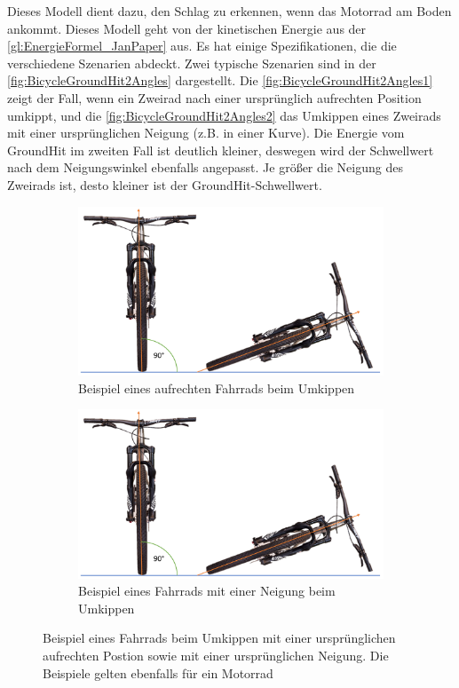 Dieses Modell dient dazu, den Schlag zu erkennen, wenn das Motorrad am Boden ankommt. Dieses Modell geht von der kinetischen Energie aus der \autoref{gl:EnergieFormel_JanPaper} aus. Es hat einige Spezifikationen, die die verschiedene Szenarien abdeckt. Zwei typische Szenarien sind in der \autoref{fig:BicycleGroundHit2Angles} dargestellt. Die \autoref{fig:BicycleGroundHit2Angles1} zeigt der Fall, wenn ein Zweirad nach einer ursprünglich aufrechten Position umkippt, und die \autoref{fig:BicycleGroundHit2Angles2} das Umkippen eines Zweirads mit einer ursprünglichen Neigung (z.B. in einer Kurve).
Die Energie vom GroundHit im zweiten Fall ist deutlich kleiner, deswegen wird der Schwellwert nach dem Neigungswinkel ebenfalls angepasst. Je größer die Neigung des Zweirads ist, desto kleiner ist der GroundHit-Schwellwert.\\

\begin{figure}[htpb]
	\centering
	\begin{subfigure}{0.49\textwidth}
		\centering
		\includegraphics[page = 1, width=\textwidth]{Bilder/BicycleGroundHit2Angles.pdf}
		\caption{Beispiel eines aufrechten Fahrrads beim Umkippen}
		\label{fig:BicycleGroundHit2Angles1}
	\end{subfigure}
	\begin{subfigure}{0.49\textwidth}
		\centering
		\includegraphics[page = 2, width=\textwidth]{Bilder/BicycleGroundHit2Angles.pdf}
		\caption{Beispiel eines Fahrrads mit einer Neigung beim Umkippen}
		\label{fig:BicycleGroundHit2Angles2}
	\end{subfigure}
	\caption{Beispiel eines Fahrrads beim Umkippen mit einer ursprünglichen aufrechten Postion sowie mit einer ursprünglichen Neigung. Die Beispiele gelten ebenfalls für ein Motorrad}
	\label{fig:BicycleGroundHit2Angles}
\end{figure}

